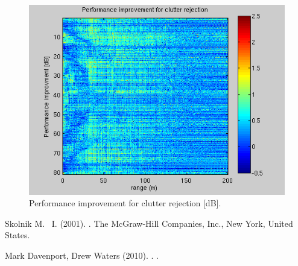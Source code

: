 \documentclass{article}
\begin{document}
\begin{figure}[ht]
\begin{minipage}[b]{0.33\linewidth}
\includegraphics[width=\textwidth]{Figures/improvement_31.png}
\caption{Performance improvement for clutter rejection [dB].}
\label{fig:improvement_31}
\end{minipage}
\end{figure}

\newpage
\begin{thebibliography}{9}

Skolnik M. ~I.  (2001).
.
\newblock The McGraw-Hill Companies, Inc., New York, United States.

Mark Davenport, Drew Waters (2010).
.
.

\end{thebibliography}
\end{document}
